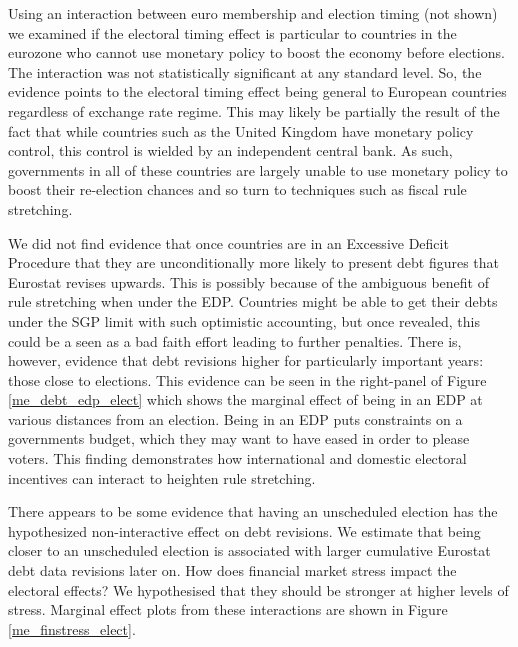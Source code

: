 \documentclass[]{article}
\begin{document}
Using an interaction between euro membership and election timing (not shown) we examined if the electoral timing effect is particular to countries in the eurozone who cannot use monetary policy to boost the economy before elections. The interaction was not statistically significant at any standard level. So, the evidence points to the electoral timing effect being general to European countries regardless of exchange rate regime. This may likely be partially the result of the fact that while countries such as the United Kingdom have monetary policy control, this control is wielded by an independent central bank. As such, governments in all of these countries are largely unable to use monetary policy to boost their re-election chances and so turn to techniques such as fiscal rule stretching.

We did not find evidence that once countries are in an Excessive Deficit Procedure that they are unconditionally more likely to present debt figures that Eurostat revises upwards. This is possibly because of the ambiguous benefit of rule stretching when under the EDP. Countries might be able to get their debts under the SGP limit with such optimistic accounting, but once revealed, this could be a seen as a bad faith effort leading to further penalties. There is, however, evidence that debt revisions higher for particularly important years: those close to elections. This evidence can be seen in the right-panel of Figure \ref{me_debt_edp_elect} which shows the marginal effect of being in an EDP at various distances from an election. Being in an EDP puts constraints on a governments budget, which they may want to have eased in order to please voters. This finding demonstrates how international and domestic electoral incentives can interact to heighten rule stretching.

There appears to be some evidence that having an unscheduled election has the hypothesized non-interactive effect on debt revisions. We estimate that being closer to an unscheduled election is associated with larger cumulative Eurostat debt data revisions later on. How does financial market stress impact the electoral effects? We hypothesised that they should be stronger at higher levels of stress. Marginal effect plots from these interactions are shown in Figure \ref{me_finstress_elect}.
\end{document}
